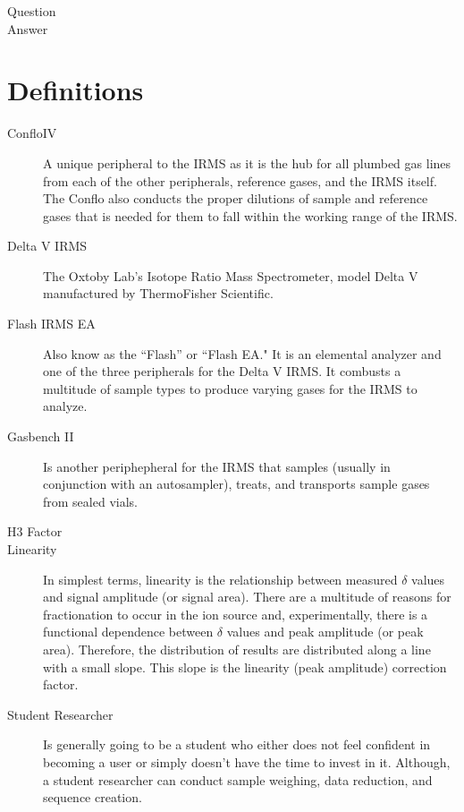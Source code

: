\documentclass[12pt]{../SOP4_alpha}\usepackage[]{graphicx}\usepackage[]{color}
\begin{document}
\NP Question \\
Answer

\section{Definitions}

\begin{description}

\item[ConfloIV] A unique peripheral to the IRMS as it is the hub for all plumbed gas lines from each of the other peripherals, reference gases, and the IRMS itself. The Conflo also conducts the proper dilutions of sample and reference gases that is needed for them to fall within the working range of the IRMS.

\item[Delta V IRMS] \label{IRMS} The Oxtoby Lab's Isotope Ratio Mass Spectrometer, model Delta V manufactured by ThermoFisher Scientific. 

\item[Flash IRMS EA] Also know as the ``Flash'' or ``Flash EA." It is an elemental analyzer and one of the three peripherals for the Delta V IRMS. It combusts a multitude of sample types to produce varying gases for the IRMS to analyze. 

\item[Gasbench II] Is another periphepheral for the IRMS that samples (usually in conjunction with an autosampler), treats, and transports sample gases from sealed vials.

\item[H3 Factor]

\item[Linearity] In simplest terms, linearity is the relationship between measured $\delta$ values and signal amplitude (or signal area). There are a multitude of reasons for fractionation to occur in the ion source and, experimentally, there is a functional dependence between $\delta$ values and peak amplitude (or peak area). Therefore, the distribution of results are distributed along a line with a small slope. This slope is the linearity (peak amplitude) correction factor. 

\item[Student Researcher] Is generally going to be a student who either does not feel confident in becoming a user or simply doesn't have the time to invest in it. Although, a student researcher can conduct sample weighing, data reduction, and sequence creation.


\end{description}
\end{document}
